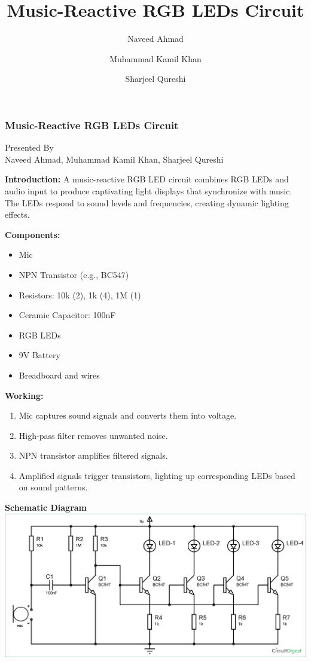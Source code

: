 \documentclass{beamer}
\title{Music-Reactive RGB LEDs Circuit}
\author{Naveed Ahmad \and Muhammad Kamil Khan \and Sharjeel Qureshi}
\date{}
\begin{document}
\begin{frame}[plain]
  \titlepage
\end{frame}

\begin{frame}[t]
  \frametitle{Music-Reactive RGB LEDs Circuit}
  \begin{center}
    \LARGE Presented By \\
    Naveed Ahmad, Muhammad Kamil Khan, Sharjeel Qureshi
  \end{center}

  \vspace{0.5cm}

  \textbf{Introduction:}
  A music-reactive RGB LED circuit combines RGB LEDs and audio input to produce captivating light displays that synchronize with music. The LEDs respond to sound levels and frequencies, creating dynamic lighting effects.

  \vspace{0.5cm}

  \textbf{Components:}
  \begin{itemize}
    \item Mic
    \item NPN Transistor (e.g., BC547)
    \item Resistors: 10k (2), 1k (4), 1M (1)
    \item Ceramic Capacitor: 100nF
    \item RGB LEDs
    \item 9V Battery
    \item Breadboard and wires
  \end{itemize}

  \vspace{0.5cm}

  \textbf{Working:}
  \begin{enumerate}
    \item Mic captures sound signals and converts them into voltage.
    \item High-pass filter removes unwanted noise.
    \item NPN transistor amplifies filtered signals.
    \item Amplified signals trigger transistors, lighting up corresponding LEDs based on sound patterns.
  \end{enumerate}

  \vspace{0.5cm}

  \begin{center}
    \textbf{Schematic Diagram}
    \includegraphics[scale=0.7]{image1.png}
  \end{center}
\end{frame}
\end{document}
